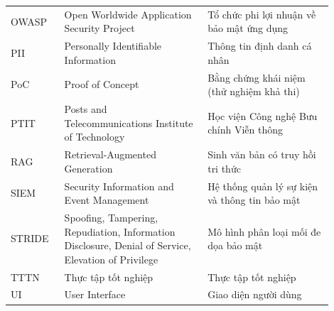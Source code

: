 \begin{longtable}{p{0.15\linewidth} p{0.4\linewidth} p{0.35\linewidth}}
\addlinespace
OWASP & Open Worldwide Application Security Project & Tổ chức phi lợi nhuận về bảo mật ứng dụng \\
\addlinespace
PII & Personally Identifiable Information & Thông tin định danh cá nhân \\
\addlinespace
PoC & Proof of Concept & Bằng chứng khái niệm (thử nghiệm khả thi) \\
\addlinespace
PTIT & Posts and Telecommunications Institute of Technology & Học viện Công nghệ Bưu chính Viễn thông \\
\addlinespace
RAG & Retrieval-Augmented Generation & Sinh văn bản có truy hồi tri thức \\
\addlinespace
SIEM & Security Information and Event Management & Hệ thống quản lý sự kiện và thông tin bảo mật \\
\addlinespace
STRIDE & Spoofing, Tampering, Repudiation, Information Disclosure, Denial of Service, Elevation of Privilege & Mô hình phân loại mối đe dọa bảo mật \\
\addlinespace
TTTN & Thực tập tốt nghiệp & Thực tập tốt nghiệp \\
\addlinespace
UI & User Interface & Giao diện người dùng \\

\end{longtable}
